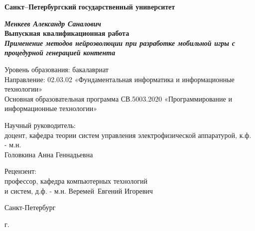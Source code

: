 \begin{titlepage}
\begin{center}

\textbf{Санкт--Петербургский}
\textbf{государственный университет}

\vspace{30mm}

\textbf{\textit{\large Менкеев Александр Саналович}} \\[8mm]
\textbf{\large Выпускная квалификационная работа}\\[3mm]
\textbf{\textit{\large Применение методов нейроэволюции при разработке мобильной игры с процедурной генерацией контента}}

\vspace{20mm}
Уровень образования: бакалавриат\\
Направление: 02.03.02 «Фундаментальная информатика и информационные технологии»\\
Основная образовательная программа СВ.5003.2020 
«Программирование и информационные технологии»\\[10mm]


\begin{flushright}
\begin{minipage}[t]{0.6\textwidth}
{Научный руководитель:} \\
доцент, кафедра теории систем управления электрофизической аппаратурой, к.ф. - м.н.\\ Головкина Анна Геннадьевна

\vspace{6mm}

{Рецензент:} \\
профессор, кафедра компьютерных технологий \\и систем, д.ф. - м.н. Веремей~Евгений Игоревич
\end{minipage}
\end{flushright}

\vfill 

{Санкт-Петербург}
\par{\the\year{} г.}
\end{center}
\end{titlepage}
\restoregeometry
\addtocounter{page}{1}
